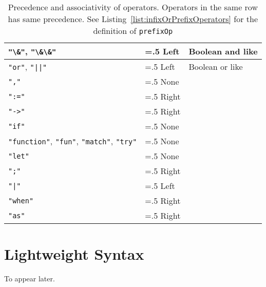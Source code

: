 \begin{table}[ht]
\begin{tabularx}{\linewidth}{|>{\hsize=1\hsize\raggedright\arraybackslash}X|>{\hsize=.5\hsize}X|>{\hsize=1.5\hsize}X|}
     \hline
    \mbox{\lstinline[language=ebnf]|"\&"|,} \mbox{\lstinline[language=ebnf]|"\&\&"|} & Left & Boolean and like\\
     \hline
    \mbox{\lstinline[language=ebnf]|"or"|,} \mbox{\lstinline[language=ebnf]!"||"!} & Left & Boolean or like\\
     \hline
     \lstinline[language=ebnf]|","| & None & \\
     \hline
     \lstinline[language=ebnf]|":="| & Right & \\
     \hline
     \lstinline[language=ebnf]|"->"| & Right & \\
     \hline
    \lstinline[language=ebnf]|"if"| & None & \\
     \hline
    \mbox{\lstinline[language=ebnf]|"function"|,} \mbox{\lstinline[language=ebnf]|"fun"|,} \mbox{\lstinline[language=ebnf]|"match"|,} \mbox{\lstinline[language=ebnf]|"try"|}& None & \\
     \hline
     \lstinline[language=ebnf]|"let"| & None & \\
     \hline
     \lstinline[language=ebnf]|";"| & Right & \\
     \hline
     \lstinline[language=ebnf]!"|"! & Left & \\
     \hline
     \lstinline[language=ebnf]|"when"| & Right & \\
     \hline
     \lstinline[language=ebnf]|"as"| & Right & \\
     \hline
  \end{tabularx}
  \caption{Precedence and associativity of operators. Operators in the same row has same precedence. See Listing~\ref{list:infixOrPrefixOperators} for the definition of \lstinline!prefixOp!}
  \label{tab:operatorPrecedence}
\end{table}
\clearpage

\begin{comment}
\section{Behind the scene}
\jon{I'm not sure, whether it will be a good idea to describe this. Could be used as the umbrella for the specifikation of the program.} When a program is compiled or interpreted the following steps are performed by the system
  \begin{enumerate}
  \item Decoding
  \item Tokenization
  \item Lexical Filtering
  \item Parsing
  \item Importing
  \item Checking
  \item Elaboration
  \item Execution
  \end{enumerate}
  \dots
\end{comment}

\section{Lightweight Syntax}
To appear later.

